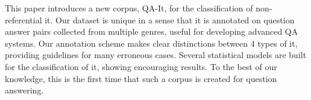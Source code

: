This paper introduces a new corpus, QA-It, for the classification of non-referential it. Our dataset is unique in a sense that it is annotated on question answer pairs collected from multiple genres, useful for developing advanced QA systems. Our annotation scheme makes clear distinctions between 4 types of it, providing guidelines for many erroneous cases. Several statistical models are built for the classification of it, showing encouraging results. To the best of our knowledge, this is the first time that such a corpus is created for question answering.
